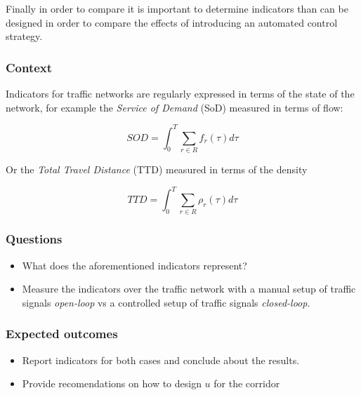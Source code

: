 \documentclass[]{book}
\theoremstyle{definition}
\theoremstyle{definition}
\theoremstyle{definition}
\theoremstyle{remark}
\begin{document}
Finally in order to compare it is important to determine indicators than
can be designed in order to compare the effects of introducing an
automated control strategy.

\hypertarget{context-4}{%
\subsubsection*{Context}\label{context-4}}

Indicators for traffic networks are regularly expressed in terms of the
state of the network, for example the \emph{Service of Demand} (SoD)
measured in terms of flow:

\begin{equation}
SOD = \int_0^T \sum_{r \in R} f_r(\tau) d\tau \label{eq:sod}
\end{equation}

Or the \emph{Total Travel Distance} (TTD) measured in terms of the
density

\begin{equation}
TTD = \int_0^T \sum_{r \in R} \rho_r(\tau) d\tau \label{eq:ttd}
\end{equation}

\hypertarget{questions-3}{%
\subsubsection*{Questions}\label{questions-3}}

\begin{itemize}
\item
  What does the aforementioned indicators represent?
\item
  Measure the indicators over the traffic network with a manual setup of
  traffic signals \emph{open-loop} vs a controlled setup of traffic
  signals \emph{closed-loop}.
\end{itemize}

\hypertarget{expected-outcomes-3}{%
\subsubsection*{Expected outcomes}\label{expected-outcomes-3}}

\begin{itemize}
\item
  Report indicators for both cases and conclude about the results.
\item
  Provide recomendations on how to design \(u\) for the corridor
\end{itemize}
\end{document}
